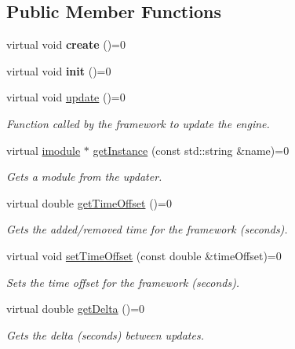 \subsection*{Public Member Functions}
\begin{DoxyCompactItemize}
\item 
\mbox{\label{classflounder_1_1iupdater_adf13e2f8614c4c404cf3b4beb44f2674}} 
virtual void {\bfseries create} ()=0
\item 
\mbox{\label{classflounder_1_1iupdater_a5128e5ed39459981c40f17ec7d1de331}} 
virtual void {\bfseries init} ()=0
\item 
virtual void \hyperlink{classflounder_1_1iupdater_a9f9102652e1ec25f7e9fc9b1cd57a041}{update} ()=0
\begin{DoxyCompactList}\small\item\em Function called by the framework to update the engine. \end{DoxyCompactList}\item 
virtual \hyperlink{classflounder_1_1imodule}{imodule} $\ast$ \hyperlink{classflounder_1_1iupdater_a391b1788b5c139b199ed48033da1b88d}{get\+Instance} (const std\+::string \&name)=0
\begin{DoxyCompactList}\small\item\em Gets a module from the updater. \end{DoxyCompactList}\item 
virtual double \hyperlink{classflounder_1_1iupdater_abd983cbbeed27f28e9be768a2d3b69f2}{get\+Time\+Offset} ()=0
\begin{DoxyCompactList}\small\item\em Gets the added/removed time for the framework (seconds). \end{DoxyCompactList}\item 
virtual void \hyperlink{classflounder_1_1iupdater_aa6aa143e40a5a39bcd53753798438ea1}{set\+Time\+Offset} (const double \&time\+Offset)=0
\begin{DoxyCompactList}\small\item\em Sets the time offset for the framework (seconds). \end{DoxyCompactList}\item 
virtual double \hyperlink{classflounder_1_1iupdater_a1e8d40602f9799fc82d96d5b845cf796}{get\+Delta} ()=0
\begin{DoxyCompactList}\small\item\em Gets the delta (seconds) between updates. \end{DoxyCompactList}\item 

\end{DoxyCompactItemize}
